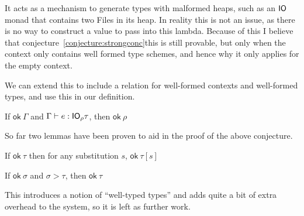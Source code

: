 It acts as a mechanism to generate types with malformed heaps, such as
an $\mathsf{IO}$ monad that contains two \textsf{File}s in its heap.  In
reality this is not an issue, as there is no way to construct a value
to pass into this lambda. Because of this I believe that conjecture~\ref{conjecture:strongconc}this is still
provable, but only when the context only contains well formed type
schemes, and hence why it only applies for the empty context.

We can extend this to include a relation for well-formed contexts and
well-formed types, and use this in our definition. 


\begin{conjecture}
  If $\textsf{ok} \ \Gamma$ and $\Gamma \vdash e : \mathsf{IO}_\rho \tau$, then $\textsf{ok} \ \rho$
\end{conjecture}
So far two lemmas have been proven to aid in the proof of the above
conjecture.
\begin{lemma}
  If $\textsf{ok} \ \tau$ then for any substitution $s$, $\textsf{ok} \ \tau[s]$
\end{lemma}
\begin{lemma}
  If $\textsf{ok} \ \sigma$ and $\sigma > \tau$, then $\textsf{ok} \ \tau$
\end{lemma}

This introduces a notion of ``well-typed types'' and adds quite a bit
of extra overhead to the system, so it is left as further work.

